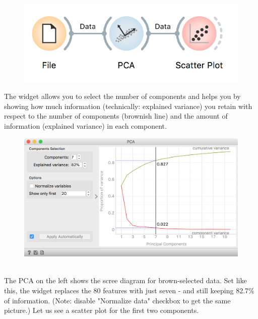 \begin{figure}
    \includegraphics[width=\linewidth]{workflow-scatterplot.png}
    \label{fig:wf1}
\end{figure}

The widget allows you to select the number of components and helps you by showing how much information (technically: explained variance) you retain with respect to the number of components (brownish line) and the amount of information (explained variance) in each component.

\begin{figure}[h]
    \centering
    \includegraphics[width=\linewidth]{pca-scree.png}
    \caption{$\;$}
\end{figure}

The PCA on the left shows the scree diagram for brown-selected data. Set like this, the widget replaces the 80 features with just seven - and still keeping 82.7\% of information. (Note: disable "Normalize data" checkbox to get the same picture.) Let us see a scatter plot for the first two components.

